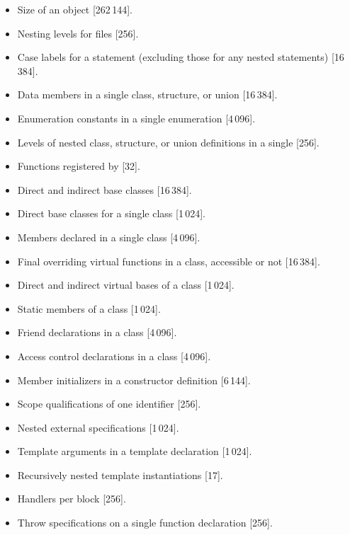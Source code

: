 \begin{paras}
\begin{itemize}
(after concatenation) [65\,536].
\item%
Size of an object [262\,144].
\item%
Nesting levels for
files [256].
\item%
Case labels for a
statement (excluding those for any nested
statements)
[16\,384].
\item%
Data members in a single class, structure, or union [16\,384].
\item%
Enumeration constants in a single enumeration [4\,096].
\item%
Levels of nested class, structure, or union definitions
in a single
[256].
\item%
Functions registered by
 [32].
\item%
Direct and indirect base classes [16\,384].
\item%
Direct base classes for a single class [1\,024].
\item%
Members declared in a single class [4\,096].
\item%
Final overriding virtual functions in a class,
accessible or not [16\,384].
\item%
Direct and indirect virtual bases of a class [1\,024].
\item%
Static members of a class [1\,024].
\item%
Friend declarations in a class [4\,096].
\item%
Access control declarations in a class [4\,096].
\item%
Member initializers in a constructor definition [6\,144].
\item%
Scope qualifications of one identifier [256].
\item%
Nested external specifications [1\,024].
\item%
Template arguments in a template declaration [1\,024].
\item%
Recursively nested template instantiations [17].
\item%
Handlers per
block [256].
\item%
Throw specifications on a single function declaration [256].

\end{itemize}

\end{paras}
